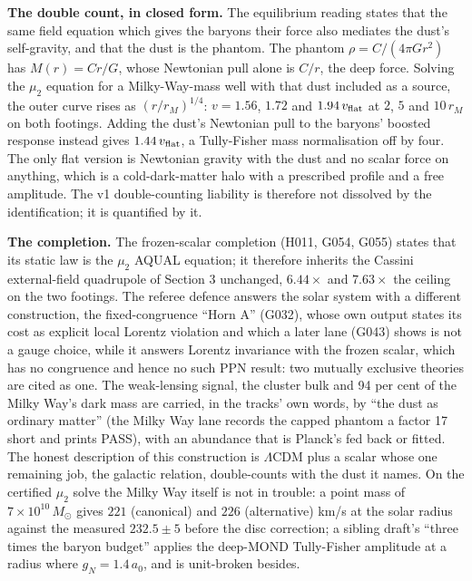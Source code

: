 \documentclass[
  11pt,
]{article}
\begin{document}
\textbf{The double count, in closed form.} The equilibrium reading
states that the same field equation which gives the baryons their force
also mediates the dust's self-gravity, and that the dust is the phantom.
The phantom \(\rho = C/(4\pi Gr^2)\) has \(M(r) = Cr/G\), whose
Newtonian pull alone is \(C/r\), the deep force. Solving the \(\mu_2\)
equation for a Milky-Way-mass well with that dust included as a source,
the outer curve rises as \((r/r_M)^{1/4}\): \(v = 1.56\), \(1.72\) and
\(1.94\,v_{\rm flat}\) at \(2\), \(5\) and \(10\,r_M\) on both footings.
Adding the dust's Newtonian pull to the baryons' boosted response
instead gives \(1.44\,v_{\rm flat}\), a Tully-Fisher mass normalisation
off by four. The only flat version is Newtonian gravity with the dust
and no scalar force on anything, which is a cold-dark-matter halo with a
prescribed profile and a free amplitude. The v1 double-counting
liability is therefore not dissolved by the identification; it is
quantified by it.

\textbf{The completion.} The frozen-scalar completion (H011, G054, G055)
states that its static law is the \(\mu_2\) AQUAL equation; it therefore
inherits the Cassini external-field quadrupole of Section 3 unchanged,
\(6.44\times\) and \(7.63\times\) the ceiling on the two footings. The
referee defence answers the solar system with a different construction,
the fixed-congruence ``Horn A'' (G032), whose own output states its cost
as explicit local Lorentz violation and which a later lane (G043) shows
is not a gauge choice, while it answers Lorentz invariance with the
frozen scalar, which has no congruence and hence no such PPN result: two
mutually exclusive theories are cited as one. The weak-lensing signal,
the cluster bulk and 94 per cent of the Milky Way's dark mass are
carried, in the tracks' own words, by ``the dust as ordinary matter''
(the Milky Way lane records the capped phantom a factor 17 short and
prints PASS), with an abundance that is Planck's fed back or fitted. The
honest description of this construction is \(\Lambda\)CDM plus a scalar
whose one remaining job, the galactic relation, double-counts with the
dust it names. On the certified \(\mu_2\) solve the Milky Way itself is
not in trouble: a point mass of \(7\times10^{10}\,M_\odot\) gives
\(221\) (canonical) and \(226\) (alternative) km/s at the solar radius
against the measured \(232.5 \pm 5\) before the disc correction; a
sibling draft's ``three times the baryon budget'' applies the deep-MOND
Tully-Fisher amplitude at a radius where \(g_N = 1.4\,a_0\), and is
unit-broken besides.
\end{document}
